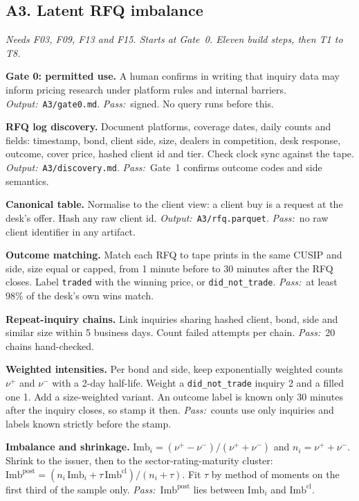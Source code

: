 \documentclass[11pt,letterpaper]{article}
\makeatletter
\newcommand{\code}[1]{\texttt{#1}}
\newcommand{\Imb}{\mathrm{Imb}}
\newcommand*{\twodigit}[1]{\expandafter\@twodigit\csname c@#1\endcsname}
\newcommand*{\@twodigit}[1]{\ifnum#1<10 0\fi\number#1}
\newcommand{\stepname}[1]{\textbf{#1.}}
\newcommand{\Out}{\textit{Output:}~}
\newcommand{\Pass}{\textit{Pass:}~}
\makeatother
\begin{document}
\subsection{A3. Latent RFQ imbalance}
\emph{Needs F03, F09, F13 and F15. Starts at Gate~0. Eleven build steps, then T1 to T8.}
\begin{ladder}[label=\textbf{A3.\twodigit*}]
\item \stepname{Gate 0: permitted use} A human confirms in writing that inquiry data may inform pricing research under platform rules and internal barriers. \Out \code{A3/gate0.md}. \Pass signed. No query runs before this.
\item \stepname{RFQ log discovery} Document platforms, coverage dates, daily counts and fields: timestamp, bond, client side, size, dealers in competition, desk response, outcome, cover price, hashed client id and tier. Check clock sync against the tape. \Out \code{A3/discovery.md}. \Pass Gate~1 confirms outcome codes and side semantics.
\item \stepname{Canonical table} Normalise to the client view: a client buy is a request at the desk's offer. Hash any raw client id. \Out \code{A3/rfq.parquet}. \Pass no raw client identifier in any artifact.
\item \stepname{Outcome matching} Match each RFQ to tape prints in the same CUSIP and side, size equal or capped, from 1 minute before to 30 minutes after the RFQ closes. Label \code{traded} with the winning price, or \code{did_not_trade}. \Pass at least 98\% of the desk's own wins match.
\item \stepname{Repeat-inquiry chains} Link inquiries sharing hashed client, bond, side and similar size within 5 business days. Count failed attempts per chain. \Pass 20 chains hand-checked.
\item \stepname{Weighted intensities} Per bond and side, keep exponentially weighted counts $\nu^{+}$ and $\nu^{-}$ with a 2-day half-life. Weight a \code{did_not_trade} inquiry 2 and a filled one 1. Add a size-weighted variant. An outcome label is known only 30 minutes after the inquiry closes, so stamp it then. \Pass counts use only inquiries and labels known strictly before the stamp.
\item \stepname{Imbalance and shrinkage} $\Imb_i=(\nu^{+}-\nu^{-})/(\nu^{+}+\nu^{-})$ and $n_i=\nu^{+}+\nu^{-}$. Shrink to the issuer, then to the sector-rating-maturity cluster: $\Imb^{\mathrm{post}}=(n_i\,\Imb_i+\tau\,\Imb^{\mathrm{cl}})/(n_i+\tau)$. Fit $\tau$ by method of moments on the first third of the sample only. \Pass $\Imb^{\mathrm{post}}$ lies between $\Imb_i$ and $\Imb^{\mathrm{cl}}$.

\end{ladder}
\end{document}
